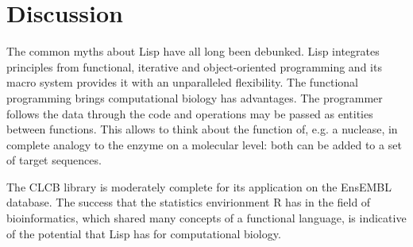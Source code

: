 \documentclass{article}
\begin{document}
\section{Discussion}

The common myths about Lisp have all long been debunked. Lisp integrates
principles from functional, iterative and object-oriented programming and
its macro system provides it with an unparalleled flexibility. The
functional programming brings computational biology has advantages. The
programmer follows the data through the code and operations may be passed 
as entities between functions. This allows to think about the function of,
e.g. a nuclease, in complete analogy to the enzyme on a molecular level:
both can be added to a set of target sequences.

The CLCB library is moderately complete for its application on the EnsEMBL
database. The success that the statistics envirionment R \cite{Rbioinformatics}
has in the field of bioinformatics, which shared many concepts of a
functional language, is indicative of the potential that Lisp has for
computational biology.



\end{document}
